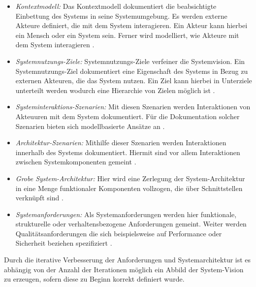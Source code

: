\begin{itemize}
\item \emph{Kontextmodell:}
Das Kontextmodell dokumentiert die beabsichtigte Einbettung des Systems in seine Systemumgebung. Es werden externe Akteure definiert, die mit dem System interagieren. Ein Akteur kann hierbei ein Mensch oder ein System sein. Ferner wird modelliert, wie Akteure mit dem System interagieren \cite{Poh01}.
\item \emph{Systemnutzungs-Ziele:}
Systemnutzungs-Ziele verfeiner die Systemvision. Ein Systemnutzungs-Ziel dokumentiert eine Eigenschaft des Systems in Bezug zu externen Akteuren, die das System nutzen. Ein Ziel kann hierbei in Unterziele unterteilt werden wodurch eine Hierarchie von Zielen m\"oglich ist \cite{Poh01}.  
\item \emph{Systeminteraktions-Szenarien:}
Mit diesen Szenarien werden Interaktionen von Akteuuren mit dem System dokumentiert. F\"ur die Dokumentation solcher Szenarien bieten sich modellbasierte Ans\"atze an \cite{Poh01}.
\item \emph{Architektur-Szenarien:}
Mithilfe dieser Szenarien werden Interaktionen innerhalb des Systems dokumentiert. Hiermit sind vor allem Interaktionen zwischen Systemkomponenten gemeint \cite{Poh01}. 
\item \emph{Grobe System-Architektur:}
Hier wird eine Zerlegung der System-Architektur in eine Menge funktionaler Komponenten vollzogen, die \"uber Schnittstellen verkn\"upft sind \cite{Poh01}.
\item \emph{Systemanforderungen:}
Als Systemanforderungen werden hier funktionale, strukturelle oder verhaltensbezogene Anforderungen gemeint. Weiter werden Qualit\"atsanforderungen die sich beispielsweise auf Performance oder Sicherheit beziehen spezifiziert \cite{Poh01}.\\
\end{itemize}

Durch die iterative Verbesserung der Anforderungen und Systemarchitektur ist es abh\"angig von der Anzahl der Iterationen m\"oglich ein Abbild der System-Vision zu erzeugen, sofern diese zu Beginn korrekt definiert wurde.
